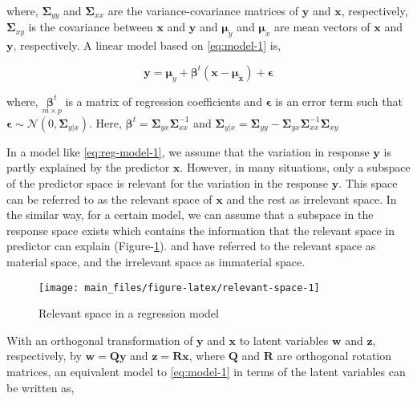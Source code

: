 \documentclass[12pt,3p,authoryear]{elsarticle}
\begin{document}
where, \(\boldsymbol{\Sigma}_{yy}\) and \(\boldsymbol{\Sigma}_{xx}\) are
the variance-covariance matrices of \(\mathbf{y}\) and \(\mathbf{x}\),
respectively, \(\boldsymbol{\Sigma}_{xy}\) is the covariance between
\(\mathbf{x}\) and \(\mathbf{y}\) and \(\boldsymbol{\mu}_y\) and
\(\boldsymbol{\mu}_x\) are mean vectors of \(\mathbf{x}\) and
\(\mathbf{y}\), respectively. A linear model based on \eqref{eq:model-1}
is,

\begin{equation}
\mathbf{y} = \boldsymbol{\mu}_y + 
  \boldsymbol{\beta}^t(\mathbf{x} - \boldsymbol{\mu_x}) + 
  \boldsymbol{\epsilon}
\label{eq:reg-model-1}
\end{equation}

where, \(\underset{m\times p}{\boldsymbol{\beta}^t}\) is a matrix of
regression coefficients and \(\boldsymbol{\epsilon}\) is an error term
such that
\(\boldsymbol{\epsilon} \sim \mathcal{N}(0, \boldsymbol{\Sigma}_{y|x})\).
Here,
\(\boldsymbol{\beta}^t = \mathbf{\Sigma}_{yx}\mathbf{\Sigma}_{xx}^{-1}\)
and
\(\boldsymbol{\Sigma}_{y|x} = \boldsymbol{\Sigma}_{yy} - \boldsymbol{\Sigma}_{yx}\boldsymbol{\Sigma}_{xx}^{-1}\boldsymbol{\Sigma}_{xy}\)

In a model like \eqref{eq:reg-model-1}, we assume that the variation in
response \(\mathbf{y}\) is partly explained by the predictor
\(\mathbf{x}\). However, in many situations, only a subspace of the
predictor space is relevant for the variation in the response
\(\mathbf{y}\). This space can be referred to as the relevant space of
\(\mathbf{x}\) and the rest as irrelevant space. In the similar way, for
a certain model, we can assume that a subspace in the response space
exists which contains the information that the relevant space in
predictor can explain (Figure-\ref{fig:relevant-space}).
\citet{cook2010envelope} and \citet{cook2015simultaneous} have referred
to the relevant space as material space, and the irrelevant space as
immaterial space.

\begin{figure}

{\centering \texttt{[image: main\_files/figure-latex/relevant-space-1]} 

}

\caption{Relevant space in a regression model}\label{fig:relevant-space}
\end{figure}

With an orthogonal transformation of \(\mathbf{y}\) and \(\mathbf{x}\)
to latent variables \(\mathbf{w}\) and \(\mathbf{z}\), respectively, by
\(\mathbf{w=Qy}\) and \(\mathbf{z = Rx}\), where \(\mathbf{Q}\) and
\(\mathbf{R}\) are orthogonal rotation matrices, an equivalent model to
\eqref{eq:model-1} in terms of the latent variables can be written as,
\end{document}
